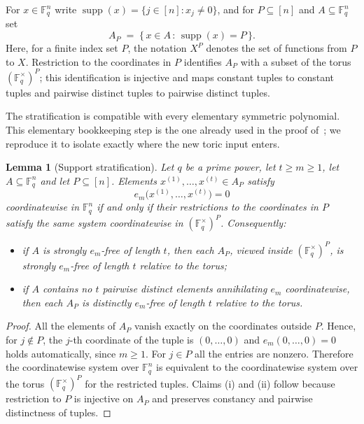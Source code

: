 \documentclass[10pt,a4paper]{amsart}
\newtheorem{lemma}[theorem]{Lemma}
\theoremstyle{definition}
\newcommand{\F}{\mathbb F}
\newcommand{\supp}{\operatorname{supp}}
\newcommand{\1}{\mathbf 1}
\begin{document}
For $x\in\F_q^n$ write $\supp(x)=\{j\in[n] : x_j\neq 0\}$, and for
$P\subseteq[n]$ and $A\subseteq\F_q^n$ set
\[
A_P \;=\; \{\,x\in A \,:\, \supp(x)=P\,\}.
\]
Here, for a finite index set $P$, the notation $X^P$ denotes the set of functions from $P$ to $X$.  Restriction to the coordinates in $P$ identifies $A_P$ with a subset of the
torus $(\F_q^{\times})^{P}$; this identification is injective and maps
constant tuples to constant tuples and pairwise distinct tuples to pairwise
distinct tuples.

The stratification is compatible with every elementary symmetric polynomial.  This elementary bookkeeping step is the one already used in the proof of~\cite[Theorem~4.3]{CostaDellaFiore}; we reproduce it to isolate exactly where the new toric input enters.

\begin{lemma}[Support stratification]\label{lem:stratification}
Let $q$ be a prime power, let $t\geq m\geq 1$, let $A\subseteq\F_q^n$ and let
$P\subseteq[n]$. Elements $x^{(1)},\dots,x^{(t)}\in A_P$ satisfy
\[
e_m\bigl(x^{(1)},\dots,x^{(t)}\bigr)=0
\]
coordinatewise in $\F_q^n$ if and only if their restrictions to the
coordinates in $P$ satisfy the same system coordinatewise in
$(\F_q^{\times})^{P}$. Consequently:
\begin{itemize}
\item[(i)] if $A$ is strongly $e_m$-free of length $t$, then each $A_P$,
viewed inside $(\F_q^{\times})^{P}$, is strongly $e_m$-free of length $t$
relative to the torus;
\item[(ii)] if $A$ contains no $t$ pairwise distinct elements annihilating
$e_m$ coordinatewise, then each $A_P$ is distinctly $e_m$-free of length $t$
relative to the torus.
\end{itemize}
\end{lemma}

\begin{proof}
All the elements of $A_P$ vanish exactly on the coordinates outside $P$.
Hence, for $j\notin P$, the $j$-th coordinate of the tuple is
$(0,\dots,0)$ and $e_m(0,\dots,0)=0$ holds automatically, since $m\geq 1$.
For $j\in P$ all the entries are nonzero. Therefore the coordinatewise system
over $\F_q^n$ is equivalent to the coordinatewise system over the torus
$(\F_q^{\times})^{P}$ for the restricted tuples. Claims (i) and (ii) follow
because restriction to $P$ is injective on $A_P$ and preserves constancy and
pairwise distinctness of tuples.
\end{proof}
\end{document}
